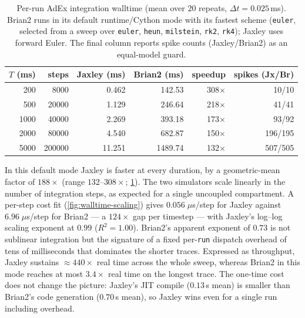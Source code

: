 \begin{table}[t]
  \centering
  \caption{Per-run \gls{AdEx} integration walltime (mean over $20$ repeats, $\Delta t = 0.025$\,ms).
  Brian2 runs in its default runtime/Cython mode with its fastest scheme (\texttt{euler}, selected from a sweep over \texttt{euler}, \texttt{heun}, \texttt{milstein}, \texttt{rk2}, \texttt{rk4}); Jaxley uses forward Euler.
  The final column reports spike counts (Jaxley/Brian2) as an equal-model guard.}
  \label{tab:walltime}
  \begin{tabular}{rrrrrr}
    \toprule
    $T$ (ms) & steps & Jaxley (ms) & Brian2 (ms) & speedup & spikes (Jx/Br) \\
    \midrule
    200 & 8000 & 0.462 & 142.53 & 308$\times$ & 10/10 \\
    500 & 20000 & 1.129 & 246.64 & 218$\times$ & 41/41 \\
    1000 & 40000 & 2.269 & 393.18 & 173$\times$ & 93/92 \\
    2000 & 80000 & 4.540 & 682.87 & 150$\times$ & 196/195 \\
    5000 & 200000 & 11.251 & 1489.74 & 132$\times$ & 507/505 \\
    \bottomrule
  \end{tabular}
\end{table}

In this default mode Jaxley is faster at every duration, by a geometric-mean factor of $188\times$ (range $132$--$308\times$; \cref{tab:walltime}).
The two simulators scale linearly in the number of integration steps, as expected for a single uncoupled compartment.
A per-step cost fit (\cref{fig:walltime-scaling}) gives $0.056\;\mu$s/step for Jaxley against $6.96\;\mu$s/step for Brian2 --- a $124\times$ gap per timestep --- with Jaxley's log--log scaling exponent at $0.99$ ($R^2 = 1.00$).
Brian2's apparent exponent of $0.73$ is not sublinear integration but the signature of a fixed per-\texttt{run} dispatch overhead of tens of milliseconds that dominates the shorter traces.
Expressed as throughput, Jaxley sustains $\approx 440\times$ real time across the whole sweep, whereas Brian2 in this mode reaches at most $3.4\times$ real time on the longest trace.
The one-time cost does not change the picture: Jaxley's \gls{JIT} compile ($0.13$\,s mean) is smaller than Brian2's code generation ($0.70$\,s mean), so Jaxley wins even for a single run including overhead.

